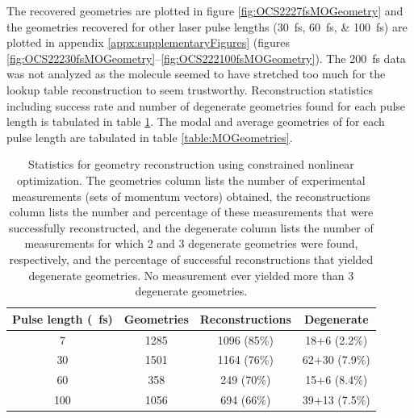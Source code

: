 The recovered geometries are plotted in figure \ref{fig:OCS2227fsMOGeometry} and the geometries recovered for other laser pulse lengths (\SIlist{30;60;100}{\femto\s}) are plotted in appendix \ref{appx:supplementaryFigures} (figures \ref{fig:OCS22230fsMOGeometry}--\ref{fig:OCS222100fsMOGeometry}). The \SI{200}{\femto\s} data was not analyzed as the molecule seemed to have stretched too much for the lookup table reconstruction to seem trustworthy. Reconstruction statistics including success rate and number of degenerate geometries found for each pulse length is tabulated in table \ref{table:MOSuccess}. The modal and average geometries of for each pulse length are tabulated in table \ref{table:MOGeometries}.


\begin{table}
  \myfloatalign
  \centering
  \begin{tabularx}{\textwidth}{cccc}
    \toprule
    Pulse length (\SI{}{\fs}) & Geometries & Reconstructions & Degenerate \\
    \midrule
    7 & 1285 & 1096 (85\%) & 18+6 (2.2\%) \\
    30 & 1501 & 1164 (76\%) & 62+30 (7.9\%) \\
    60 & 358 & 249 (70\%) & 15+6 (8.4\%) \\
    100 & 1056 & 694 (66\%) & 39+13 (7.5\%) \\
    \bottomrule
  \end{tabularx}
  \caption[Statistics for geometry reconstruction using constrained nonlinear optimization as a function of pulse length.]
  {Statistics for geometry reconstruction using constrained nonlinear optimization. The geometries column lists the number of experimental measurements (sets of momentum vectors) obtained, the reconstructions column lists the number and percentage of these measurements that were successfully reconstructed, and the degenerate column lists the number of measurements for which 2 and 3 degenerate geometries were found, respectively, and the percentage of successful reconstructions that yielded degenerate geometries. No measurement ever yielded more than 3 degenerate geometries.}
  \label{table:MOSuccess}
\end{table}

